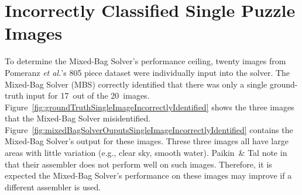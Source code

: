 \chapter{Incorrectly Classified Single Puzzle Images}\label{chap:incorreclyClassifiedSingleImages}

To determine the Mixed-Bag Solver's performance ceiling, twenty images from Pomeranz \textit{et al.}'s 805 piece dataset were individually input into the solver.  The Mixed-Bag Solver (MBS) correctly identified that there was only a single ground-truth input for 17~out of the 20~images.  Figure~\ref{fig:groundTruthSingleImageIncorrectlyIdentified} shows the three images that the Mixed-Bag Solver misidentified.  Figure~\ref{fig:mixedBagSolverOuputsSingleImageIncorrectlyIdentified} contains the Mixed-Bag Solver's output for these images.  Threse three images all have large areas with little variation (e.g., clear sky, smooth water).  Paikin~\& Tal note in~\cite{paikin2015} that their assembler does not perform well on such images.  Therefore, it is expected the Mixed-Bag Solver's performance on these images may improve if a different assembler is used.

